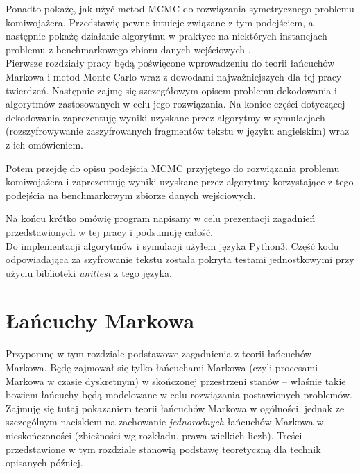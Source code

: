 \documentclass[a4paper]{article}
\theoremstyle{defn}
\theoremstyle{theorem}
\theoremstyle{lemma}
\theoremstyle{cor}
\theoremstyle{fact}
\begin{document}
Ponadto pokażę, jak użyć metod MCMC do rozwiązania symetrycznego problemu komiwojażera. Przedstawię pewne intuicje związane z tym podejściem, a następnie pokażę działanie algorytmu w praktyce na niektórych instancjach problemu z benchmarkowego zbioru danych wejściowych \cite{benchmark}.
\\

Pierwsze rozdziały pracy będą poświęcone wprowadzeniu do teorii łańcuchów Markowa i metod Monte Carlo wraz z dowodami najważniejszych dla tej pracy twierdzeń. Następnie zajmę się szczegółowym opisem problemu dekodowania i algorytmów zastosowanych w celu jego rozwiązania. Na koniec części dotyczącej dekodowania zaprezentuję wyniki uzyskane przez algorytmy w symulacjach (rozszyfrowywanie zaszyfrowanych fragmentów tekstu w języku angielskim) wraz z ich omówieniem.

Potem przejdę do opisu podejścia MCMC przyjętego do rozwiązania problemu komiwojażera i zaprezentuję wyniki uzyskane przez algorytmy korzystające z tego podejścia na benchmarkowym zbiorze danych wejściowych.

Na końcu krótko omówię program napisany w celu prezentacji zagadnień przedstawionych w tej pracy i podsumuję całość.
\\

Do implementacji algorytmów i symulacji użyłem języka Python3. Część kodu odpowiadająca za szyfrowanie tekstu została pokryta testami jednostkowymi przy użyciu biblioteki \textit{unittest} z tego języka.

\newpage

\section{Łańcuchy Markowa}
\label{sect2}
Przypomnę w tym rozdziale podstawowe zagadnienia z teorii łańcuchów Markowa. Będę zajmował się tylko łańcuchami Markowa (czyli procesami Markowa w czasie dyskretnym) w skończonej przestrzeni stanów – właśnie takie bowiem łańcuchy będą modelowane w celu rozwiązania postawionych problemów. Zajmuję się tutaj pokazaniem teorii łańcuchów Markowa w ogólności, jednak ze szczególnym naciskiem na zachowanie \textit{jednorodnych} łańcuchów Markowa w nieskończoności (zbieżności wg rozkładu, prawa wielkich liczb). Treści przedstawione w tym rozdziale stanowią podstawę teoretyczną dla technik opisanych później.
\end{document}
